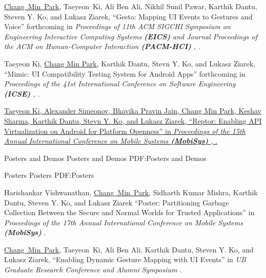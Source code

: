 \documentclass[letterpaper,MMMyyyy,nonstopmode]{simpleresumecv}
\begin{document}
\begin{Body}
\begingroup
\renewcommand{\MaxNumberedItem}{[88]}

\BigGap
\NumberedItem{[1]} 
\underline{Chang~Min~Park}, Taeyeon~Ki, Ali Ben Ali, 
Nikhil Sunil Pawar, Karthik Dantu, Steven Y. Ko, and Lukasz Ziarek, 
``Gesto: Mapping UI Events to Gestures and Voice''
forthcoming in
\textit{Proceedings of 11th ACM SIGCHI Symposium on Engineering Interactive Computing Systems \textbf{(EICS)}
and \textit{Journal Proceedings of the ACM on Human-Computer Interaction \textbf{(PACM-HCI)}}
, .}

\Gap
\NumberedItem{[2]}
Taeyeon Ki, \underline{Chang Min Park}, Karthik Dantu, Stevn Y. Ko, and Lukasz Ziarek, 
``Mimic: UI Compatibility Testing System for Android Apps'' forthcoming in
\textit{Proceedings of the 41st International Conference on Software Engineering \textbf{(ICSE)}
, .}

\Gap
\NumberedItem{[3]}
\href{https://dl.acm.org/citation.cfm?id=3081341}
{Taeyeon Ki, Alexander Simeonov, Bhavika Pravin Jain, \underline{Chang Min Park},
Keshav Sharma, Karthik Dantu, Stevn Y. Ko, and Lukasz Ziarek, 
``Reptor: Enabling API Virtualization on Android for Platform Openness'' in 
\textit{Proceedings of the 15th Annual International Conference on Mobile Systems \textbf{(MobiSys)}
, }.}






\Section
{Posters and Demos}
{Posters and Demos}
{PDF:Posters and Demos}

\SubSection
{Posters}
{Posters}
{PDF:Posters}

\begingroup
\renewcommand{\MaxNumberedItem}{[88]}

\BigGap
\NumberedItem{[1]}
Harishankar Vishwanathan, \underline{Chang~Min~Park}, Sidharth Kumar Mishra, Karthik Dantu, 
Steven Y. Ko, and Lukasz Ziarek
``Poster: Partitioning Garbage Collection Between the Secure and Normal Worlds for Trusted Applications'' in
\textit{Proceedings of the 17th Annual International Conference on Mobile Systems \textbf{(MobiSys)}
}.

\Gap
\NumberedItem{[2]}
\underline{Chang~Min~Park}, Taeyeon~Ki, Ali Ben Ali, Karthik Dantu, Steven Y. Ko, 
and Lukasz Ziarek, 
``Enabling Dynamic Gesture Mapping with UI Events'' in
\textit{UB Graduate Research Conference and Alumni Symposium
.}



\end{Body}
\end{document}
